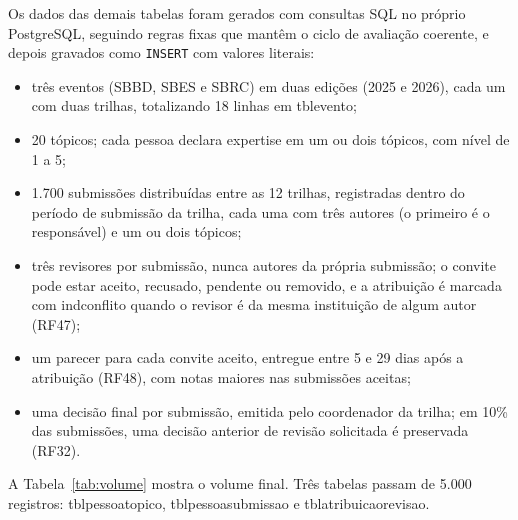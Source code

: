\documentclass[12pt,a4paper]{article}
\newcommand{\tbus}{\textunderscore\allowbreak}
\newcommand{\tb}[1]{{\ttfamily\let\_\tbus #1}}
\begin{document}
Os dados das demais tabelas foram gerados com consultas SQL no próprio PostgreSQL,
seguindo regras fixas que mantêm o ciclo de avaliação coerente, e depois gravados como
\texttt{INSERT} com valores literais:
\begin{itemize}
    \item três eventos (SBBD, SBES e SBRC) em duas edições (2025 e 2026), cada um com
    duas trilhas, totalizando 18 linhas em \tb{tbl\_evento};
    \item 20 tópicos; cada pessoa declara expertise em um ou dois tópicos, com nível de
    1 a 5;
    \item 1.700 submissões distribuídas entre as 12 trilhas, registradas dentro do
    período de submissão da trilha, cada uma com três autores (o primeiro é o
    responsável) e um ou dois tópicos;
    \item três revisores por submissão, nunca autores da própria submissão; o convite
    pode estar aceito, recusado, pendente ou removido, e a atribuição é marcada com
    \tb{ind\_conflito} quando o revisor é da mesma instituição de algum autor (RF47);
    \item um parecer para cada convite aceito, entregue entre 5 e 29 dias após a
    atribuição (RF48), com notas maiores nas submissões aceitas;
    \item uma decisão final por submissão, emitida pelo coordenador da trilha; em 10\%
    das submissões, uma decisão anterior de revisão solicitada é preservada (RF32).
\end{itemize}

A Tabela~\ref{tab:volume} mostra o volume final. Três tabelas passam de 5.000
registros: \tb{tbl\_pessoa\_topico}, \tb{tbl\_pessoa\_submissao} e
\tb{tbl\_atribuicao\_revisao}.
\end{document}
